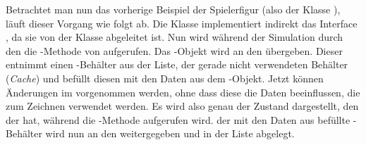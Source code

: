 \documentclass[12pt,a4paper,listof=totocnumbered,parskip=half, abstract=yes]{scrartcl}
\begin{document}
Betrachtet man nun das vorherige Beispiel der Spielerfigur (also der Klasse ), läuft dieser Vorgang wie folgt ab. Die Klasse  implementiert indirekt das Interface , da sie von der Klasse  abgeleitet ist. Nun wird während der Simulation durch den  die -Methode von  aufgerufen. Das -Objekt wird an den  übergeben. Dieser entnimmt einen -Behälter aus der Liste, der gerade nicht verwendeten Behälter (\emph{Cache}) und befüllt diesen mit den Daten aus dem -Objekt. Jetzt können Änderungen im  vorgenommen werden, ohne dass diese die Daten beeinflussen, die zum Zeichnen verwendet werden. Es wird also genau der Zustand dargestellt, den der  hat, während die -Methode aufgerufen wird. der mit den Daten aus  befüllte -Behälter wird nun an den  weitergegeben und in der Liste  abgelegt.
\end{document}
